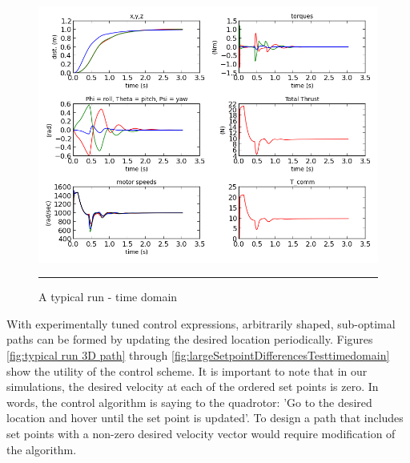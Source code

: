 \begin{figure}[htbp]
	\centering
		\includegraphics[width=\textwidth]{Figures/typical_run_time_domain.png}
		\rule{35em}{0.5pt}
	\caption[typical run time domain]{A typical run - time domain}
	\label{fig:typical run time domain}
\end{figure}




With experimentally tuned control expressions, arbitrarily shaped, sub-optimal paths can be formed by updating the desired location periodically. Figures \ref{fig:typical run 3D path} through \ref{fig:largeSetpointDifferencesTesttimedomain} show the utility of the control scheme. It is important to note that in our simulations, the desired velocity at each of the ordered set points is zero. In words, the control algorithm is saying to the quadrotor: 'Go to the desired location and hover until the set point is updated'. To design a path that includes set points with a non-zero desired velocity vector would require modification of the algorithm.


